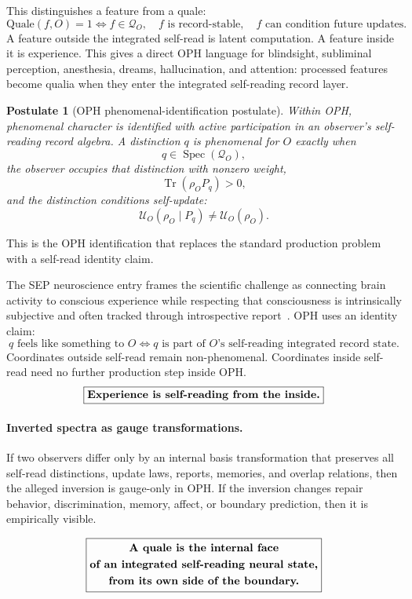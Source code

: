\documentclass[11pt]{article}
\newtheorem{postulate}[theorem]{Postulate}
\theoremstyle{remark}
\theoremstyle{plain}
\begin{document}
This distinguishes a feature from a quale:
\[
\boxed{
\mathrm{Quale}(f,O)=1
\Longleftrightarrow
f\in\mathcal Q_O,\quad
f\text{ is record-stable},\quad
f\text{ can condition future updates}.
}
\]
A feature outside the integrated self-read is latent computation. A feature inside it is experience. This gives a direct OPH language for blindsight, subliminal perception, anesthesia, dreams, hallucination, and attention: processed features become qualia when they enter the integrated self-reading record layer.

\begin{postulate}[OPH phenomenal-identification postulate]
Within OPH, phenomenal character is identified with active participation in an observer's self-reading record algebra. A distinction \(q\) is phenomenal for \(O\) exactly when
\[
q\in\operatorname{Spec}(\mathcal Q_O),
\]
the observer occupies that distinction with nonzero weight,
\[
\operatorname{Tr}(\rho_O P_q)>0,
\]
and the distinction conditions self-update:
\[
\mathcal U_O(\rho_O\mid P_q)\ne \mathcal U_O(\rho_O).
\]
\end{postulate}

This is the OPH identification that replaces the standard production problem with a self-read identity claim.

The SEP neuroscience entry frames the scientific challenge as connecting brain activity to conscious experience while respecting that consciousness is intrinsically subjective and often tracked through introspective report~\cite{SEPNeuroscienceConsciousness}. OPH uses an identity claim:
\[
\boxed{
q\text{ feels like something to }O
\Longleftrightarrow
q\text{ is part of }O\text{'s self-reading integrated record state.}
}
\]
Coordinates outside self-read remain non-phenomenal. Coordinates inside self-read need no further production step inside OPH.
\[
\boxed{
\text{\bfseries Experience is self-reading from the inside.}
}
\]

\paragraph{Inverted spectra as gauge transformations.}
If two observers differ only by an internal basis transformation that preserves all self-read distinctions, update laws, reports, memories, and overlap relations, then the alleged inversion is gauge-only in OPH. If the inversion changes repair behavior, discrimination, memory, affect, or boundary prediction, then it is empirically visible.

\[
\boxed{
\begin{gathered}
\text{\bfseries A quale is the internal face}\\
\text{\bfseries of an integrated self-reading neural state,}\\
\text{\bfseries from its own side of the boundary.}
\end{gathered}
}
\]
\end{document}
